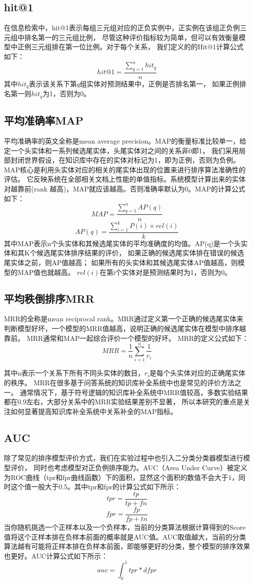 \subsection{hit@1}
在信息检索中，hit@1表示每组三元组对应的正负实例中，正实例在该组正负例三元组中排名第一的三元组比例，
尽管这种评价指标较为简单，但可以有效衡量模型中正例三元组排在第一位比例。对于每个关系，
我们定义的的Hit@1计算公式如下：
$$hit@1=\frac{\sum_{q=1}^n{hit_q}}{n}$$
其中$hit_q$表示该关系下第$q$组实体对预测结果中，正例是否排名第一，
如果正例排名第一则$hit_q$为1，否则为0。

\subsection{平均准确率MAP}
平均准确率的英文全称是mean average precision。MAP的衡量标准比较单一，给定一个头实体和一系列候选尾实体，头尾实体对之间的关系非0即1，
我们采用局部封闭世界假设，在知识库中存在的实体对标记为1，即为正例，否则为负例。
MAP核心是利用头实体对应的相关的尾实体出现的位置来进行排序算法准确性的评估。
它反映系统在全部相关文档上性能的单值指标。系统模型计算出来的实体对越靠前(rank 越高)，MAP就应该越高。否则准确率默认为0。MAP的计算公式如下：
$$MAP=\frac{\sum_{q=1}^nAP(q)}{n}$$
$$AP(q)=\frac{\sum_{i=1}^kP(i)\times rel(i)}{k}$$
其中MAP表示n个头实体和其候选尾实体的平均准确度的均值。AP(q)是一个头实体和其K个候选尾实体排序结果的评价，
如果正确的候选尾实体排在错误的候选尾实体之前，则AP值越高；
如果所有的头实体和其候选尾实体AP值越高，则模型的MAP值也就越高。
$rel(i)$在第i个实体对是预测结果时为1，否则为0。

\subsection{平均秩倒排序MRR}
MRR的全称是mean reciprocal rank。MRR通过定义第一个正确的候选尾实体来判断模型好坏，一个模型的MRR值越高，说明正确的候选尾实体在模型中排序越靠前。
MRR通常和MAP一起综合评价一个模型的好坏。
MRR的定义公式如下：
$$MRR=\frac{1}{n} \sum_{i=1}^n \frac{1}{r_i}$$

其中n表示一个关系下所有不同头实体的数目，$r_i$是每个头实体对应的正确尾实体的秩序。
MRR在很多基于问答系统的知识库补全系统\cite{West2014}中也是常见的评价方法之一。
通常情况下，基于符号逻辑的知识库补全系统中MRR值较高，多数实验结果都在0.9左右，大部分关系中的MRR实验结果差别不显著，
所以本研究的重点是关注如何显著提高知识库补全系统中关系补全的MAP指标。

\subsection{AUC}
除了常见的排序模型评价方式，我们在实验过程中也引入二分类分类器模型进行模型评价，
同时也考虑模型对正负例排序能力。AUC（Area Under Curve）被定义为ROC曲线（tpr和fpr曲线函数）下的面积，显然这个面积的数值不会大于1，同时这个值一般大于0.5。其中tpr和fpr的计算公式如下所示：
$$tpr=\frac{tp}{tp+fn}$$
$$fpr=\frac{fp}{fp+tn}$$
当你随机挑选一个正样本以及一个负样本，当前的分类算法根据计算得到的Score值将这个正样本排在负样本前面的概率就是AUC值。AUC取值越大，当前的分类算法越有可能将正样本排在负样本前面，即能够更好的分类，整个模型的排序效果也更好。AUC计算公式如下所示：
$$auc=\int_{0}^{1}{tpr}*d{fpr}$$

